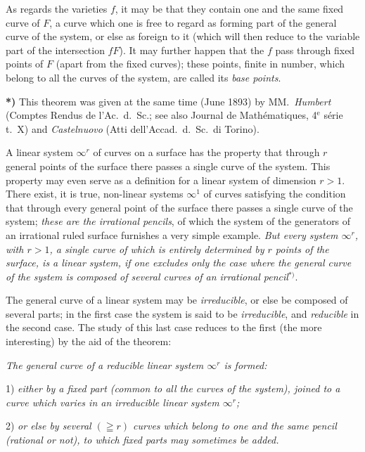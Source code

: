 \documentclass{article}
\begin{document}
As regards the varieties $f$, it may be that they contain one and the same fixed curve of $F$, a curve which one is free to regard as forming part of the general curve of the system, or else as foreign to it (which will then reduce to the variable part of the intersection $fF$). It may further happen that the $f$ pass through fixed points of $F$ (apart from the fixed curves); these points, finite in number, which belong to all the curves of the system, are called its \emph{base points}.

\textbf{*)} This theorem was given at the same time (June 1893) by MM.\ \emph{Humbert} (Comptes Rendus de l'Ac.\ d.\ Sc.; see also Journal de Mathématiques, 4${}^{\text{e}}$ série t.\ X) and \emph{Castelnuovo} (Atti dell'Accad.\ d.\ Sc.\ di Torino).


A linear system $\infty^{r}$ of curves on a surface has the property that through $r$ general points of the surface there passes a single curve of the system. This property may even serve as a definition for a linear system of dimension $r > 1$. There exist, it is true, non-linear systems $\infty^{1}$ of curves satisfying the condition that through every general point of the surface there passes a single curve of the system; \emph{these are the irrational pencils}, of which the system of the generators of an irrational ruled surface furnishes a very simple example. \emph{But every system $\infty^{r}$, with $r > 1$, a single curve of which is entirely determined by $r$ points of the surface, is a linear system, if one excludes only the case where the general curve of the system is composed of several curves of an irrational pencil}${}^{*)}$.

The general curve of a linear system may be \emph{irreducible}, or else be composed of several parts; in the first case the system is said to be \emph{irreducible}, and \emph{reducible} in the second case. The study of this last case reduces to the first (the more interesting) by the aid of the theorem:

\emph{The general curve of a reducible linear system $\infty^{r}$ is formed:}

1) \emph{either by a fixed part (common to all the curves of the system), joined to a curve which varies in an irreducible linear system $\infty^{r}$;}

2) \emph{or else by several $(\geqq r)$ curves which belong to one and the same pencil (rational or not), to which fixed parts may sometimes be added.}
\end{document}
